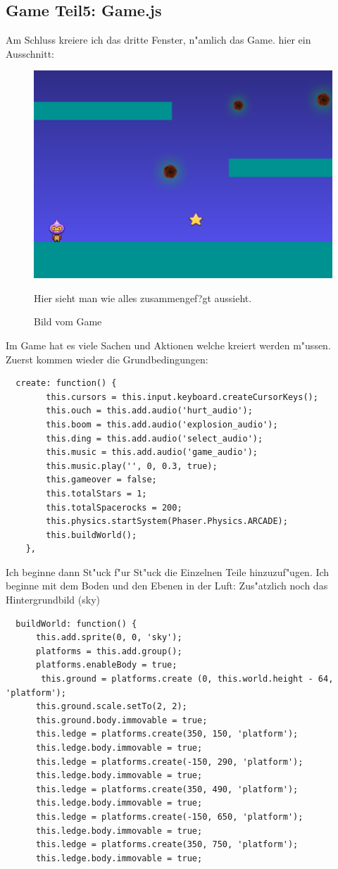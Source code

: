 \documentclass{article}
\begin{document}
\cleardoublepage
\subsection{Game Teil5: Game.js}


Am Schluss kreiere ich das dritte Fenster, n"amlich das Game.
hier ein Ausschnitt:

\begin{figure}[ht]
    \centering
    \includegraphics[width=.5\linewidth]{dude1}
    \caption{Bild vom Game}
    \label{fig:sub1}{Hier sieht man wie alles zusammengef?gt aussieht.}
    \end{figure}


Im Game hat es viele Sachen und Aktionen welche kreiert werden m"ussen.
Zuerst kommen wieder die Grundbedingungen:

\begin{lstlisting}
  create: function() {
        this.cursors = this.input.keyboard.createCursorKeys();
        this.ouch = this.add.audio('hurt_audio');
        this.boom = this.add.audio('explosion_audio');
        this.ding = this.add.audio('select_audio');
        this.music = this.add.audio('game_audio');
        this.music.play('', 0, 0.3, true);
        this.gameover = false;
        this.totalStars = 1;
        this.totalSpacerocks = 200;
        this.physics.startSystem(Phaser.Physics.ARCADE);
        this.buildWorld();
    },
\end{lstlisting}


Ich beginne dann St"uck f"ur St"uck die Einzelnen Teile hinzuzuf"ugen.
Ich beginne mit dem Boden und den Ebenen in der Luft:
Zus"atzlich noch das Hintergrundbild (sky)

\begin{lstlisting}
  buildWorld: function() {
      this.add.sprite(0, 0, 'sky');
      platforms = this.add.group();
      platforms.enableBody = true;
       this.ground = platforms.create (0, this.world.height - 64, 'platform');
      this.ground.scale.setTo(2, 2);
      this.ground.body.immovable = true;
      this.ledge = platforms.create(350, 150, 'platform');
      this.ledge.body.immovable = true;
      this.ledge = platforms.create(-150, 290, 'platform');
      this.ledge.body.immovable = true;
      this.ledge = platforms.create(350, 490, 'platform');
      this.ledge.body.immovable = true;
      this.ledge = platforms.create(-150, 650, 'platform');
      this.ledge.body.immovable = true;
      this.ledge = platforms.create(350, 750, 'platform');
      this.ledge.body.immovable = true;
\end{lstlisting}
\end{document}
